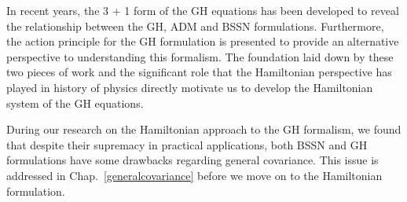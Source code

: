 In recent years, the 3 + 1 form of the GH equations\cite{Brown:2011qg} has been developed
to reveal the relationship between the GH, ADM and BSSN formulations. Furthermore, the action principle for the GH formulation\cite{Brown:2010rya} is presented to provide an alternative perspective to understanding this formalism. The foundation laid down by these two pieces of work and the significant role that the Hamiltonian perspective has played in history of physics directly motivate us to develop the Hamiltonian system of the GH equations. 

During our research on the Hamiltonian approach to the GH formalism, we found that despite their supremacy in practical applications, both BSSN and GH formulations have some drawbacks regarding general covariance. This issue is addressed in Chap.~\ref{generalcovariance} before we move on to the Hamiltonian formulation. 

